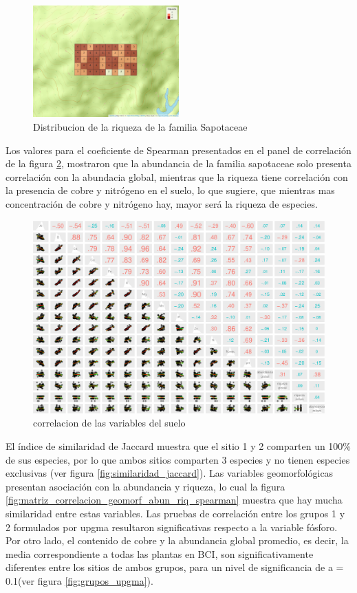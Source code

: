 \documentclass[11pt,]{article}
\begin{document}
\begin{figure}
\centering
\includegraphics[width=0.50000\textwidth]{mapa_cuadros_riq_mi_familia.png}
\caption{Distribucion de la riqueza de la familia
Sapotaceae\label{fig:mapa_cuadros_riq_mi_familia}}
\end{figure}

Los valores para el coeficiente de Spearman presentados en el panel de
correlación de la figura \ref{fig:p_cor_suelo_ar}, mostraron que la
abundancia de la familia sapotaceae solo presenta correlación con la
abundacia global, mientras que la riqueza tiene correlación con la
presencia de cobre y nitrógeno en el suelo, lo que sugiere, que mientras
mas concentración de cobre y nitrógeno hay, mayor será la riqueza de
especies.

\begin{figure}
\centering
\includegraphics{manuscrito_files/figure-latex/unnamed-chunk-4-1.pdf}
\caption{\label{fig:p_cor_suelo_ar}correlacion de las variables del
suelo}
\end{figure}

El índice de similaridad de Jaccard muestra que el sitio 1 y 2 comparten
un 100\% de sus especies, por lo que ambos sitios comparten 3 especies y
no tienen especies exclusivas (ver figura
\ref{fig:similaridad_jaccard}). Las variables geomorfológicas presentan
asociación con la abundancia y riqueza, lo cual la figura
\ref{fig:matriz_correlacion_geomorf_abun_riq_spearman} muestra que hay
mucha similaridad entre estas variables. Las pruebas de correlación
entre los grupos 1 y 2 formulados por upgma resultaron significativas
respecto a la variable fósforo. Por otro lado, el contenido de cobre y
la abundancia global promedio, es decir, la media correspondiente a
todas las plantas en BCI, son significativamente diferentes entre los
sitios de ambos grupos, para un nivel de significancia de a = 0.1(ver
figura \ref{fig:grupos_upgma}).
\end{document}
